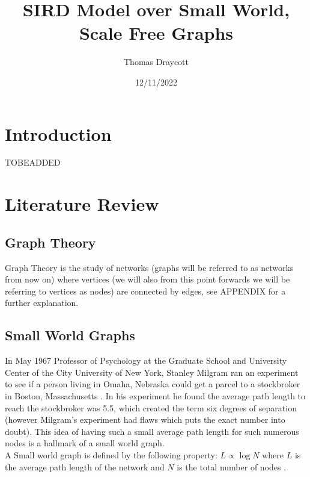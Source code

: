 \documentclass{article}
\title{SIRD Model over Small World, Scale Free Graphs}
\date{12/11/2022}
\author{Thomas Draycott}
\begin{document}
    \maketitle
    \newpage
    \section{Introduction}
    TOBEADDED
    


    \section{Literature Review}
        \subsection{Graph Theory}
        Graph Theory is the study of networks (graphs will be referred to as networks from now on) where vertices (we will also from this point forwards we will be referring to vertices as nodes) are connected by edges, see APPENDIX for a further explanation.
        \subsection{Small World Graphs}
        In May 1967 Professor of Psychology at the Graduate School and University Center of the City University of New York, Stanley Milgram ran an experiment to see if a person living
        in Omaha, Nebraska could get a parcel to a stockbroker in Boston, Massachusetts \parencite{milgram1967small}. In his experiment he found the average path length to reach the stockbroker was 5.5, which created the term
        six degrees of separation (however Milgram's experiment had flaws which puts the exact number into doubt). This idea of having such a small average path length for such numerous nodes is a hallmark of a small world graph.
        \\A Small world graph is defined by the following property: $L\propto\log{N}$ where $L$ is the average path length of the network and $N$ is the total number of nodes \parencite{Watts1998}.

    
    
    
    
\printbibliography
\end{document}

